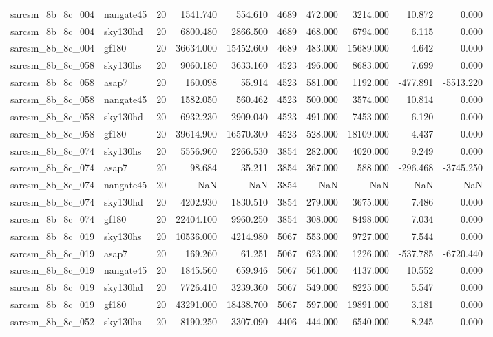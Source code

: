 \begin{longtable}{llrrrrrrrr}
sarcsm\_8b\_8c\_004 & nangate45 & 20 & 1541.740 & 554.610 & 4689 & 472.000 & 3214.000 & 10.872 & 0.000 \\
sarcsm\_8b\_8c\_004 & sky130hd & 20 & 6800.480 & 2866.500 & 4689 & 468.000 & 6794.000 & 6.115 & 0.000 \\
sarcsm\_8b\_8c\_004 & gf180 & 20 & 36634.000 & 15452.600 & 4689 & 483.000 & 15689.000 & 4.642 & 0.000 \\
sarcsm\_8b\_8c\_058 & sky130hs & 20 & 9060.180 & 3633.160 & 4523 & 496.000 & 8683.000 & 7.699 & 0.000 \\
sarcsm\_8b\_8c\_058 & asap7 & 20 & 160.098 & 55.914 & 4523 & 581.000 & 1192.000 & -477.891 & -5513.220 \\
sarcsm\_8b\_8c\_058 & nangate45 & 20 & 1582.050 & 560.462 & 4523 & 500.000 & 3574.000 & 10.814 & 0.000 \\
sarcsm\_8b\_8c\_058 & sky130hd & 20 & 6932.230 & 2909.040 & 4523 & 491.000 & 7453.000 & 6.120 & 0.000 \\
sarcsm\_8b\_8c\_058 & gf180 & 20 & 39614.900 & 16570.300 & 4523 & 528.000 & 18109.000 & 4.437 & 0.000 \\
sarcsm\_8b\_8c\_074 & sky130hs & 20 & 5556.960 & 2266.530 & 3854 & 282.000 & 4020.000 & 9.249 & 0.000 \\
sarcsm\_8b\_8c\_074 & asap7 & 20 & 98.684 & 35.211 & 3854 & 367.000 & 588.000 & -296.468 & -3745.250 \\
sarcsm\_8b\_8c\_074 & nangate45 & 20 & NaN & NaN & 3854 & NaN & NaN & NaN & NaN \\
sarcsm\_8b\_8c\_074 & sky130hd & 20 & 4202.930 & 1830.510 & 3854 & 279.000 & 3675.000 & 7.486 & 0.000 \\
sarcsm\_8b\_8c\_074 & gf180 & 20 & 22404.100 & 9960.250 & 3854 & 308.000 & 8498.000 & 7.034 & 0.000 \\
sarcsm\_8b\_8c\_019 & sky130hs & 20 & 10536.000 & 4214.980 & 5067 & 553.000 & 9727.000 & 7.544 & 0.000 \\
sarcsm\_8b\_8c\_019 & asap7 & 20 & 169.260 & 61.251 & 5067 & 623.000 & 1226.000 & -537.785 & -6720.440 \\
sarcsm\_8b\_8c\_019 & nangate45 & 20 & 1845.560 & 659.946 & 5067 & 561.000 & 4137.000 & 10.552 & 0.000 \\
sarcsm\_8b\_8c\_019 & sky130hd & 20 & 7726.410 & 3239.360 & 5067 & 549.000 & 8225.000 & 5.547 & 0.000 \\
sarcsm\_8b\_8c\_019 & gf180 & 20 & 43291.000 & 18438.700 & 5067 & 597.000 & 19891.000 & 3.181 & 0.000 \\
sarcsm\_8b\_8c\_052 & sky130hs & 20 & 8190.250 & 3307.090 & 4406 & 444.000 & 6540.000 & 8.245 & 0.000 \\

\end{longtable}
